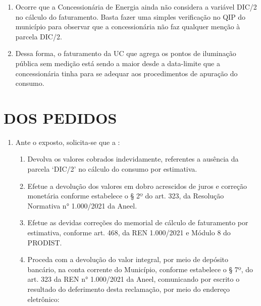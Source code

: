 \begin{enumerate}[resume]
{    [...]

    II - 7 de julho de 2021 para adequação ao §4º do art. 21-A, §4º do art. 21-E, §1º do art. 22, inciso IV do art. 24 e §7º do art. 24-A; (grifou-se)
}

\item Ocorre que a Concessionária de Energia ainda não considera a variável DIC/2 no cálculo do faturamento. Basta fazer uma simples verificação no QIP do município para observar que a concessionária não faz qualquer menção à parcela DIC/2.
\item Dessa forma, o faturamento da UC que agrega os pontos de iluminação pública sem medição está sendo a maior desde a data-limite que a concessionária tinha para se adequar aos procedimentos de apuração do consumo.

\end{enumerate}

\section{DOS PEDIDOS}

\begin{enumerate}[resume]
\item Ante o exposto, solicita-se que a \nomeConcessionaria{}: 
    \begin{enumerate}
        \item Devolva os valores cobrados indevidamente, referentes a ausência da parcela ‘DIC/2’ no cálculo do consumo por estimativa.
        \item Efetue a devolução dos valores em dobro acrescidos de juros e correção monetária conforme estabelece o § 2º do art. 323, da Resolução Normativa n° 1.000/2021 da Aneel.
        \item Efetue as devidas correções do memorial de cálculo de faturamento por estimativa, conforme art. 468, da REN 1.000/2021 e Módulo 8 do PRODIST.
        \item Proceda com a devolução do valor integral, por meio de depósito bancário, na conta corrente do Município, conforme estabelece o § 7º, do art. 323 da REN n° 1.000/2021 da Aneel, comunicando por escrito o resultado do deferimento desta reclamação, por meio do endereço eletrônico: \emailEmpresa{}
    \end{enumerate}
\end{enumerate}